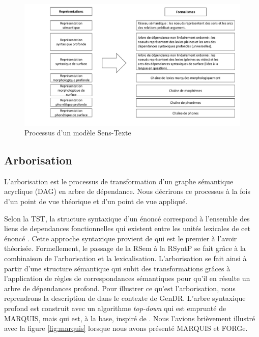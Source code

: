 \begin{figure}[htb]
	\centering
	\includegraphics[width=1\textwidth, trim = {0cm 0cm 0cm 0cm},clip]{ch3/figs/polguere2.pdf}
	\caption{Processus d'un modèle Sens-Texte \citep{PolgueretheorieSensTexte1998}}
	\label{fig:processustst}
\end{figure}


\subsection{Arborisation}\label{sec:arbo}

L'arborisation est le processus de transformation d'un graphe sémantique acyclique (DAG) en arbre de dépendance. Nous décrirons ce processus à la fois d'un point de vue théorique et d'un point de vue appliqué.

Selon la \ac{TST}, la structure syntaxique d'un énoncé correspond à l'ensemble des liens de dependances fonctionnelles qui existent entre les unités lexicales de cet énoncé \citep{melcuk1988}. Cette approche syntaxique provient de \cite{TesniereElementssyntaxestructurale1965} qui est le premier à l'avoir théorisée. Formellement, le passage de la \ac{RSem} à la \ac{RSyntP} se fait grâce à la combinaison de l'arborisation et la lexicalisation. L'arborisation se fait ainsi à partir d'une structure sémantique qui subit des transformations grâces à l'application de règles de correspondances sémantiques pour qu'il en résulte un arbre de dépendances profond. Pour illustrer ce qu'est l'arborisation, nous reprendrons la description de \cite{lareau18} dans le contexte de GenDR. L'arbre syntaxique profond est construit avec un algorithme \emph{top-down} qui est emprunté de MARQUIS, mais qui est, à la base, inspiré de \cite{PolguereStructurationmisejeu1990}. Nous l'avions brièvement illustré avec la figure \ref{fig:marquis} lorsque nous avons présenté MARQUIS et FORGe.

